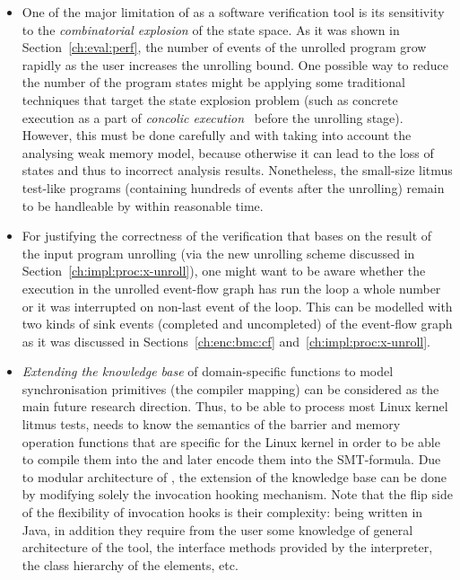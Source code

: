 \begin{itemize}[leftmargin=\parindent]
\item One of the major limitation of \porthos[2] as a software verification tool is its sensitivity to the \textit{combinatorial explosion} of the state space.
As it was shown in Section~\ref{ch:eval:perf}, the number of events of the unrolled program grow rapidly as the user increases the unrolling bound.
One possible way to reduce the number of the program states might be applying some traditional techniques that target the state explosion problem (such as concrete execution as a part of \textit{concolic execution}~\cite{majumdar2007hybrid} before the unrolling stage).
However, this must be done carefully and with taking into account the analysing weak memory model, because otherwise it can lead to the loss of states and thus to incorrect analysis results.
Nonetheless, the small-size litmus test-like programs (containing hundreds of events after the unrolling) remain to be handleable by \porthos[2] within reasonable time.


\item For justifying the correctness of the verification that bases on the result of the input program unrolling (via the new unrolling scheme discussed in Section~\ref{ch:impl:proc:x-unroll}), one might want to be aware whether the execution in the unrolled event-flow graph has run the loop a whole number or it was interrupted on non-last event of the loop.
This can be modelled with two kinds of sink events (completed and uncompleted) of the event-flow graph as it was discussed in Sections~\ref{ch:enc:bmc:cf} and~\ref{ch:impl:proc:x-unroll}.

\item \textit{Extending the knowledge base} of domain-specific functions to model synchronisation primitives (the compiler mapping) can be considered as the main future research direction.
Thus, to be able to process most Linux kernel litmus tests, \porthos[2] needs to know the semantics of the barrier and memory operation functions that are specific for the Linux kernel in order to be able to compile them into the \xgraph{} and later encode them into the SMT-formula.
Due to modular architecture of \porthos[2], the extension of the knowledge base can be done by modifying solely the invocation hooking mechanism.
Note that the flip side of the flexibility of invocation hooks is their complexity: being written in Java, in addition they require from the user some knowledge of general architecture of the tool, the interface methods provided by the interpreter, the class hierarchy of the \xgraph{} elements, etc.


\end{itemize}
